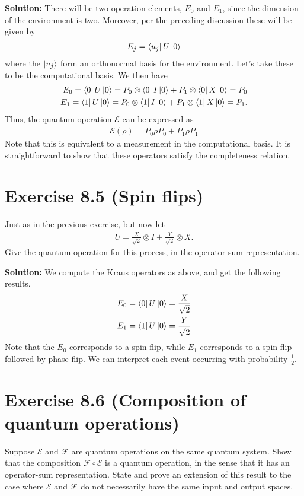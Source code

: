 \documentclass{book}
\newcommand{\mc}[1]{\mathcal{#1}}
\begin{document}
    \textbf{Solution:} There will be two operation elements, $E_0$ and $E_1$, since the dimension of the environment is two. Moreover, per the preceding discussion these will be given by
    \begin{align}
        E_j = \bra{u_j}U\ket{0}
    \end{align}
    where the $\ket{u_j}$ form an orthonormal basis for the environment. Let's take these to be the computational basis. We then have
    \begin{align}
    \begin{aligned}
        E_0 = \bra{0}U\ket{0} = P_0\otimes \bra{0}I\ket{0} + P_1 \otimes \bra{0}X\ket{0} = P_0 \\
        E_1 = \bra{1}U\ket{0} = P_0\otimes \bra{1}I\ket{0} + P_1 \otimes \bra{1}X\ket{0} = P_1.
    \end{aligned}
    \end{align}
    Thus, the quantum operation $\mc{E}$ can be expressed as
    \begin{align}
        \mc{E}(\rho) = P_0 \rho P_0 + P_1 \rho P_1
    \end{align}
    Note that this is equivalent to a measurement in the computational basis. It is straightforward to show that these operators satisfy the completeness relation. 

\section*{Exercise 8.5 (Spin flips)}
    Just as in the previous exercise, but now let 
    \begin{align}
        U = \frac{X}{\sqrt{2}}\otimes I + \frac{Y}{\sqrt{2}}\otimes X.
    \end{align}
    Give the quantum operation for this process, in the operator-sum representation.
    
    \textbf{Solution:} We compute the Kraus operators as above, and get the following results.
    \begin{align}
        E_0 = \bra{0}U\ket{0} = \frac{X}{\sqrt{2}} \\
        E_1 = \bra{1}U\ket{0} = \frac{Y}{\sqrt{2}}
    \end{align}
    Note that the $E_0$ corresponds to a spin flip, while $E_1$ corresponds to a spin flip followed by phase flip. We can interpret each event occurring with probability $\frac{1}{2}$.
    
\section*{Exercise 8.6 (Composition of quantum operations)}
    Suppose $\mc{E}$ and $\mc{F}$ are quantum operations on the same quantum system. Show that the composition $\mc{F}\circ \mc{E}$ is a quantum operation, in the sense that it has an operator-sum representation. State and prove an extension of this result to the case where $\mc{E}$ and $\mc{F}$ do not necessarily have the same input and output spaces. 
    
\end{document}
